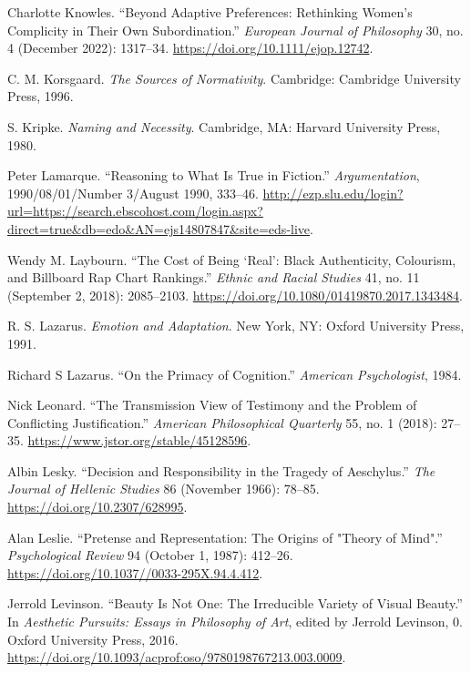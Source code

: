 \documentclass[phdthesis,12pt,final,a4paper]{wuthesis}
\newlength{\cslhangindent}
\newenvironment{CSLReferences}[2] %
{\begin{list}{}{%
	\setlength{\itemindent}{0pt}
	\setlength{\leftmargin}{0pt}
	\setlength{\parsep}{0pt}
	\ifodd #1
	\setlength{\leftmargin}{\cslhangindent}
	\setlength{\itemindent}{-1\cslhangindent}
	\fi
	\setlength{\itemsep}{#2\baselineskip}}}
{\end{list}}
\theoremstyle{definition}
\theoremstyle{definition}
\theoremstyle{definition}
\theoremstyle{definition}
\theoremstyle{remark}
\begin{document}
\begin{CSLReferences}{1}{0}
Charlotte Knowles. {``Beyond Adaptive Preferences: {Rethinking} Women's Complicity in Their Own Subordination.''} \emph{European Journal of Philosophy} 30, no. 4 (December 2022): 1317--34. \url{https://doi.org/10.1111/ejop.12742}.

C. M. Korsgaard. \emph{The Sources of Normativity}. Cambridge: Cambridge University Press, 1996.

S. Kripke. \emph{Naming and Necessity}. Cambridge, MA: Harvard University Press, 1980.

Peter Lamarque. {``Reasoning to {What} Is {True} in {Fiction}.''} \emph{Argumentation}, 1990/08/01/Number 3/August 1990, 333--46. \url{http://ezp.slu.edu/login?url=https://search.ebscohost.com/login.aspx?direct=true&db=edo&AN=ejs14807847&site=eds-live}.

Wendy M. Laybourn. {``The Cost of Being {`Real'}: Black Authenticity, Colourism, and {Billboard Rap Chart} Rankings.''} \emph{Ethnic and Racial Studies} 41, no. 11 (September 2, 2018): 2085--2103. \url{https://doi.org/10.1080/01419870.2017.1343484}.

R. S. Lazarus. \emph{Emotion and Adaptation}. New York, NY: Oxford University Press, 1991.

Richard S Lazarus. {``On the {Primacy} of {Cognition}.''} \emph{American Psychologist}, 1984.

Nick Leonard. {``The {Transmission View} of {Testimony} and the {Problem} of {Conflicting Justification}.''} \emph{American Philosophical Quarterly} 55, no. 1 (2018): 27--35. \url{https://www.jstor.org/stable/45128596}.

Albin Lesky. {``Decision and {Responsibility} in the {Tragedy} of {Aeschylus}.''} \emph{The Journal of Hellenic Studies} 86 (November 1966): 78--85. \url{https://doi.org/10.2307/628995}.

Alan Leslie. {``Pretense and {Representation}: {The Origins} of "{Theory} of {Mind}".''} \emph{Psychological Review} 94 (October 1, 1987): 412--26. \url{https://doi.org/10.1037//0033-295X.94.4.412}.

Jerrold Levinson. {``Beauty Is {Not One}: {The Irreducible Variety} of {Visual Beauty}.''} In \emph{Aesthetic {Pursuits}: {Essays} in {Philosophy} of {Art}}, edited by Jerrold Levinson, 0. Oxford University Press, 2016. \url{https://doi.org/10.1093/acprof:oso/9780198767213.003.0009}.


\end{CSLReferences}
\end{document}
